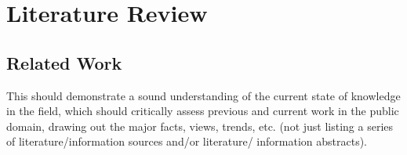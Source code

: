 
\chapter{Literature Review}\doublespacing %

\label{Chapter2} %


\section{Related Work}
This should demonstrate a sound understanding of the current state of knowledge in the field, which should critically assess previous and current work in the public domain, drawing out the major facts, views, trends, etc. (not just listing a series of literature/information sources and/or literature/ information abstracts).






